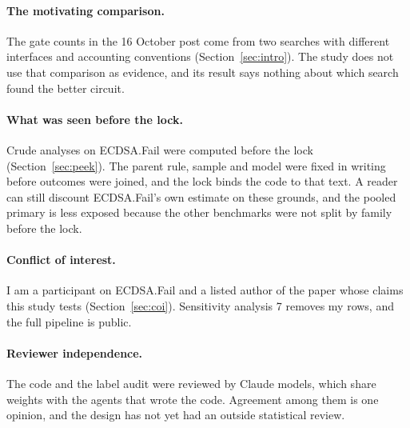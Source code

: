 \paragraph{The motivating comparison.}
The gate counts in the 16 October post come from two searches with different interfaces and accounting conventions (Section~\ref{sec:intro}).
The study does not use that comparison as evidence, and its result says nothing about which search found the better circuit.

\paragraph{What was seen before the lock.}
Crude analyses on ECDSA.Fail were computed before the lock (Section~\ref{sec:peek}).
The parent rule, sample and model were fixed in writing before outcomes were joined, and the lock binds the code to that text.
A reader can still discount ECDSA.Fail's own estimate on these grounds, and the pooled primary is less exposed because the other benchmarks were not split by family before the lock.

\paragraph{Conflict of interest.}
I am a participant on ECDSA.Fail and a listed author of the paper whose claims this study tests (Section~\ref{sec:coi}).
Sensitivity analysis 7 removes my rows, and the full pipeline is public.

\paragraph{Reviewer independence.}
The code and the label audit were reviewed by Claude models, which share weights with the agents that wrote the code.
Agreement among them is one opinion, and the design has not yet had an outside statistical review.
